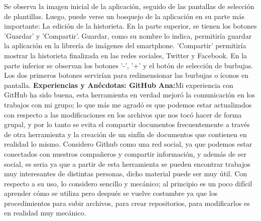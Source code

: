 \documentclass[12pt]{report}
\begin{document}
Se observa la imagen inicial de la aplicación, seguido de las pantallas de selección de plantillas. Luego, puede verse un bosquejo de la aplicación en su parte más importante: La edición de la historieta.
 \newline
 \newline
En la parte superior, se tienen los botones 'Guardar' y 'Compartir'. Guardar, como su nombre lo indica, permitiría guardar la aplicación en la librería de imágenes del smartphone. 'Compartir' permitiría mostrar la historieta finalizada en las redes sociales, Twitter y Facebook.
 \newline
 \newline
En la parte inferior se observan los botones '-', '+' y el botón de selección de burbujas. Los dos primeros botones servirían para redimensionar las burbujas o íconos en pantalla.
           \newline
           \newline
	\begingroup
		\large{
			\textbf{
			           \newline
			           \newline
				Experiencias y Anécdotas: GitHub
				\newline
				\newline
			}
		}
	\endgroup
	\textbf{Ana:\newline\newline}Mi experiencia con GitHub ha sido buena, esta herramienta en verdad mejoró la comunicación en los trabajos con mi grupo; lo que más me agradó es que podemos estar actualizados con respecto a las modificaciones en los archivos que nos tocó hacer de forma grupal, y por lo tanto se evita el compartir documentos frecuentemente a través de otra herramienta y la creación de un sinfín de documentos que contienen en realidad lo mismo.
\newline
\newline	
Considero Github como una red social, ya que podemos estar conectados con nuestros compañeros y compartir información, y además de ser social, es seria ya que a partir de esta herramienta se pueden encontrar trabajos muy interesantes de distintas personas, dicho material puede ser muy útil.
\newline
\newline	
Con respecto a su uso, lo considero sencillo y mecánico; al principio es un poco difícil aprender cómo se utiliza pero después se vuelve costumbre ya que los procedimientos para subir archivos, para crear repositorios, para modificarlos es en realidad muy mecánico.
\end{document}
